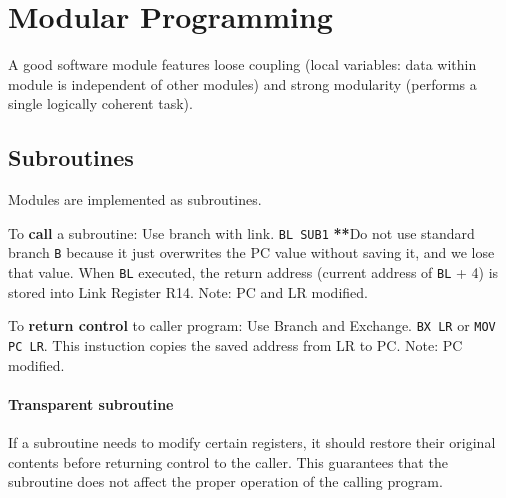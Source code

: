 \documentclass[../comorg-part1.tex]{subfiles}
\begin{document}
\section{Modular Programming}
A good software module features loose coupling (local variables: data within module is independent of other modules)
and strong modularity (performs a single logically coherent task).
\subsection{Subroutines}
Modules are implemented as subroutines.\newline

\smallskip
\noindent To \textbf{call} a subroutine: Use branch with link. \texttt{BL SUB1}\newline
\textbf{**}Do not use standard branch \texttt{B} because it just overwrites the PC value without saving it, and we lose that value.\newline
When \texttt{BL} executed, the return address (current address of \texttt{BL} + 4) is stored into Link Register R14.\newline
Note: PC and LR modified.\newline

\medskip
\noindent To \textbf{return control} to caller program: Use Branch and Exchange. \texttt{BX LR} or \texttt{MOV PC LR}.\newline
This instuction copies the saved address from LR to PC.\newline
Note: PC modified.

\paragraph{Transparent subroutine} If a subroutine needs to modify certain registers, it should restore their original contents before returning control to the caller.\newline
This guarantees that the subroutine does not affect the proper operation of the calling program.
\end{document}
